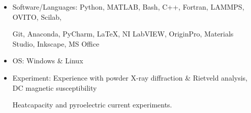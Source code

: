 \begin{itemize}[noitemsep]
\item {Software/Languages:} \hfill Python, MATLAB, Bash, C++, Fortran, LAMMPS, OVITO, Scilab, \par
\hfill Git, Anaconda, PyCharm, \LaTeX, NI LabVIEW, OriginPro, Materials Studio, Inkscape, MS Office
\item {OS}: \hfill Windows \& Linux

\item Experiment: \hfill Experience with powder X-ray diffraction \& Rietveld analysis, DC magnetic susceptibility\par \hfill Heatcapacity and pyroelectric current experiments.\vspace{0.1cm}

\end{itemize}

\vspace{-0.4cm}